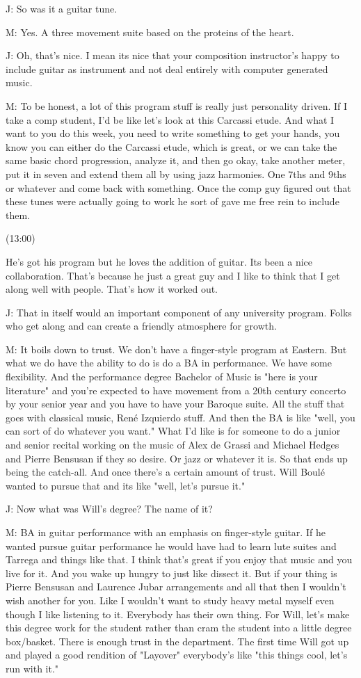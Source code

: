 \documentclass[11pt]{article}
\begin{document}
J: So was it a guitar tune.

M: Yes. A three movement suite based on the proteins of the heart.

J: Oh, that's nice. I mean its nice that your composition instructor's happy to include guitar as instrument and not deal entirely with computer generated music. 

M: To be honest, a lot of this program stuff is really just personality driven. If I take a comp student, I'd be like let's look at this Carcassi etude. And what I want to you do this week, you need to write something to get your hands, you know you can either do the Carcassi etude, which is great, or we can take the same basic chord progression, analyze it, and then go okay, take another meter, put it in seven and extend them all by using jazz harmonies. One 7ths and 9ths or whatever and come back with something. Once the comp guy figured out that these tunes were actually going to work he sort of gave me free rein to include them. 

(13:00)

He's got his program but he loves the addition of guitar. Its been a nice collaboration. That's because he just a great guy and I like to think that I get along well with people. That's how it worked out.

J: That in itself would an important component of any university program. Folks who get along and can create a friendly atmosphere for growth. 

M: It boils down to trust. We don't have a finger-style program at Eastern. But what we do have the ability to do is do a BA in performance. We have some flexibility. And the performance degree Bachelor of Music is "here is your literature" and you're expected to have movement from a 20th century concerto by your senior year and you have to have your Baroque suite. All the stuff that goes with classical music, René Izquierdo stuff. And then the BA is like "well, you can sort of do whatever you want." What I'd like is for someone to do a junior and senior recital working on the music of Alex de Grassi and Michael Hedges and Pierre Bensusan if they so desire. Or jazz or whatever it is. So that ends up being the catch-all. And once there's a certain amount of trust. Will Boulé wanted to pursue that and its like "well, let's pursue it." 

J: Now what was Will's degree? The name of it?

M: BA in guitar performance with an emphasis on finger-style guitar. If he wanted pursue guitar performance he would have had to learn lute suites and Tarrega and things like that. I think that's great if you enjoy that music and you live for it. And you wake up hungry to just like dissect it. But if your thing is Pierre Bensusan and Laurence Jubar arrangements and all that then I wouldn't wish another for you. Like I wouldn't want to study heavy metal myself even though I like listening to it. Everybody has their own thing. For Will, let's make this degree work for the student rather than cram the student into a little degree box/basket. There is enough trust in the department. The first time Will got up and played a good rendition of "Layover" everybody's like "this things cool, let's run with it." 
\end{document}

